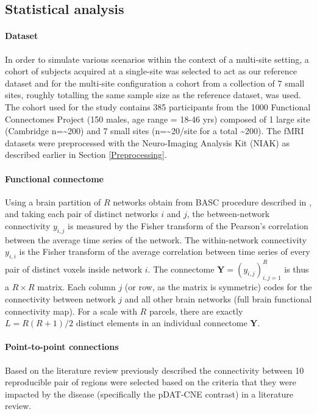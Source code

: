 \documentclass[authoryear]{elsarticle}
\begin{document}
\subsection{Statistical analysis}  

\paragraph{Dataset}
In order to simulate various scenarios within the context of a multi-site setting, a cohort of subjects acquired at a single-site was selected to act as our reference dataset and for the multi-site configuration a cohort from a collection of 7 small sites, roughly totalling the same sample size as the reference dataset, was used. The cohort used for the study contains 385 participants from the 1000 Functional Connectomes Project \citep{Biswal2010} (150 males, age range = 18-46 yrs) composed of 1 large site (Cambridge n=\textasciitilde200) and 7 small sites (n=\textasciitilde20/site for a total \textasciitilde200). The fMRI datasets were preprocessed with the Neuro-Imaging Analysis Kit (NIAK) as described earlier in Section \ref{Preprocessing}.

\paragraph{Functional connectome}
Using a brain partition of $R$ networks obtain from BASC procedure described in \cite{Bellec2010c}, and taking each pair of distinct networks $i$ and $j$, the between-network connectivity $y_{i,j}$ is measured by the Fisher transform of the Pearson's correlation between the average time series of the network. The within-network connectivity $y_{i,i}$ is the Fisher transform of the average correlation between time series of every pair of distinct voxels inside network $i$. The connectome $\mathbf{Y}=(y_{i,j})_{i,j=1}^R$ is thus a $R\times R$ matrix. Each column $j$ (or row, as the matrix is symmetric) codes for the connectivity between network $j$ and all other brain networks (full brain functional connectivity map). For a scale with $R$ parcels, there are exactly $L=R(R+1)/2$ distinct elements in an individual connectome $\mathbf{Y}$. 

\paragraph{Point-to-point connections}
Based on the literature review previously described the connectivity between 10 reproducible pair of regions were selected based on the criteria that they were impacted by the disease (specifically the pDAT-CNE contrast) in a literature review.
\end{document}
